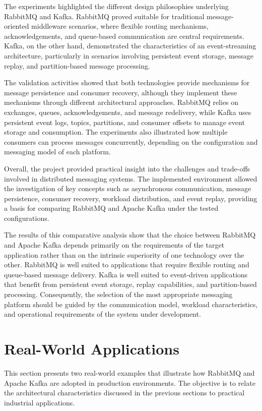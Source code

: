 \documentclass{scrartcl}
\begin{document}
The experiments highlighted the different design philosophies underlying RabbitMQ and Kafka. RabbitMQ proved suitable for traditional message-oriented middleware scenarios, where flexible routing mechanisms, acknowledgements, and queue-based communication are central requirements. Kafka, on the other hand, demonstrated the characteristics of an event-streaming architecture, particularly in scenarios involving persistent event storage, message replay, and partition-based message processing.

The validation activities showed that both technologies provide mechanisms for message persistence and consumer recovery, although they implement these mechanisms through different architectural approaches. RabbitMQ relies on exchanges, queues, acknowledgements, and message redelivery, while Kafka uses persistent event logs, topics, partitions, and consumer offsets to manage event storage and consumption. The experiments also illustrated how multiple consumers can process messages concurrently, depending on the configuration and messaging model of each platform.

Overall, the project provided practical insight into the challenges and trade-offs involved in distributed messaging systems. The implemented environment allowed the investigation of key concepts such as asynchronous communication, message persistence, consumer recovery, workload distribution, and event replay, providing a basis for comparing RabbitMQ and Apache Kafka under the tested configurations.


The results of this comparative analysis show that the choice between RabbitMQ and Apache Kafka depends primarily on the requirements of the target application rather than on the intrinsic superiority of one technology over the other. RabbitMQ is well suited to applications that require flexible routing and queue-based message delivery. Kafka is well suited to event-driven applications that benefit from persistent event storage, replay capabilities, and partition-based processing. Consequently, the selection of the most appropriate messaging platform should be guided by the communication model, workload characteristics, and operational requirements of the system under development.


\section{Real-World Applications}

This section presents two real-world examples that illustrate how RabbitMQ and
Apache Kafka are adopted in production environments. The objective is to relate
the architectural characteristics discussed in the previous sections to practical
industrial applications.
\end{document}
